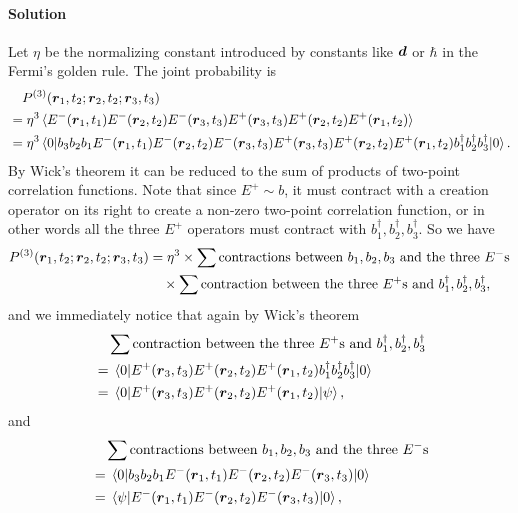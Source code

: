 \documentclass[hyperref, a4paper]{article}
\begin{document}
\paragraph{Solution} Let $\eta$ be the normalizing constant introduced by constants like $\vb*{d}$ or $\hbar$ in the Fermi's golden rule.
The joint probability is 
\[
    \begin{aligned}
        &\quad P^{(3)}(\vb*{r}_1, t_2; \vb*{r}_2, t_2; \vb*{r}_3, t_3) \\ 
        &= \eta^3 \expval*{E^-(\vb*{r}_1, t_1) E^-(\vb*{r}_2, t_2) E^-(\vb*{r}_3, t_3) E^+(\vb*{r}_3, t_3) E^+(\vb*{r}_2, t_2) E^+(\vb*{r}_1, t_2)} \\
        &= \eta^3 \expval*{b_3 b_2 b_1 E^-(\vb*{r}_1, t_1) E^-(\vb*{r}_2, t_2) E^-(\vb*{r}_3, t_3) E^+(\vb*{r}_3, t_3) E^+(\vb*{r}_2, t_2) E^+(\vb*{r}_1, t_2) b_1^\dagger b_2^\dagger b_3^\dagger}{0}.
    \end{aligned}
\]
By Wick's theorem it can be reduced to the sum of products of two-point correlation functions.
Note that since $E^+ \sim b$, it must contract with a creation operator on its right to create a non-zero two-point correlation function, or in other words all the three $E^+$ operators must contract with $b_1^\dagger, b_2^\dagger, b_3^\dagger$.
So we have 
\[
    \begin{aligned}
        P^{(3)}(\vb*{r}_1, t_2; \vb*{r}_2, t_2; \vb*{r}_3, t_3) &= \eta^3 \times \sum \text{contractions between $b_1, b_2, b_3$ and the three $E^-$s} \\
        &\quad \times \sum \text{contraction between the three $E^+$s and $b_1^\dagger, b_2^\dagger, b_3^\dagger$},
    \end{aligned}
\]
and we immediately notice that again by Wick's theorem 
\[
    \begin{aligned}
        &\quad \sum \text{contraction between the three $E^+$s and $b_1^\dagger, b_2^\dagger, b_3^\dagger$} \\
        &= \mel{0}{E^+(\vb*{r}_3, t_3) E^+(\vb*{r}_2, t_2) E^+(\vb*{r}_1, t_2) b_1^\dagger b_2^\dagger b_3^\dagger}{0} \\
        &= \mel{0}{E^+(\vb*{r}_3, t_3) E^+(\vb*{r}_2, t_2) E^+(\vb*{r}_1, t_2)}{\psi},
    \end{aligned}
\]
and 
\[
    \begin{aligned}
        &\quad \sum \text{contractions between $b_1, b_2, b_3$ and the three $E^-$s} \\
        &= \mel{0}{b_3 b_2 b_1 E^-(\vb*{r}_1, t_1) E^-(\vb*{r}_2, t_2) E^-(\vb*{r}_3, t_3)}{0} \\
        &= \mel{\psi}{E^-(\vb*{r}_1, t_1) E^-(\vb*{r}_2, t_2) E^-(\vb*{r}_3, t_3)}{0},
    \end{aligned}
\]
\end{document}
